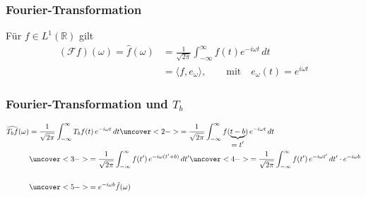 %
%
%
\theoremstyle{plancherel}
\newtheorem{plancherel}{Plancherel-Formel}

\begin{frame}
\frametitle{Fourier-Transformation}
\begin{definition}
Für $f\in L^1(\mathbb R)$ gilt
\begin{align*}
(\mathcal{F}f)(\omega)
=
\hat{f}(\omega)
&=
\frac{1}{\sqrt{2\pi}} \int_{-\infty}^\infty f(t) e^{-i\omega t}\,dt
\\
&=
\langle f,e_\omega\rangle,\qquad\text{mit}\quad e_{\omega}(t) = e^{i\omega t}
\end{align*}
\end{definition}
\end{frame}

%
%
\begin{frame}
\frametitle{Fourier-Transformation und $T_b$}
\begin{align*}
\widehat{T_bf}(\omega)
&=
\frac{1}{\sqrt{2\pi}}
\int_{-\infty}^{\infty} T_bf(t)\,e^{-i\omega t}\,dt
\uncover<2->{
=
\frac{1}{\sqrt{2\pi}}
\int_{-\infty}^{\infty} f(\underbrace{t-b}_{\displaystyle=t'})\,e^{-i\omega t}\,dt
}
\\
&\uncover<3->{=
\frac{1}{\sqrt{2\pi}}
\int_{-\infty}^{\infty} f(t')\,e^{-i\omega (t'+b)}\,dt'}
\uncover<4->{=
\frac{1}{\sqrt{2\pi}}
\int_{-\infty}^{\infty} f(t')\,e^{-i\omega t'}\,dt'
\cdot
e^{-i\omega b}}
\\[14pt]
&\uncover<5->{=
e^{-i\omega b}\hat{f}(\omega)}
\end{align*}
\end{frame}

